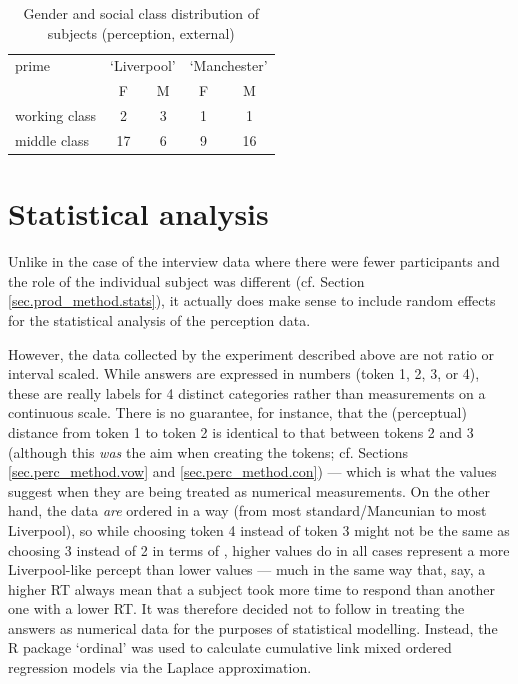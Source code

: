 \begin{table}[h]
	\caption[Gender and {social class} of subjects (perception)]{Gender and {social class} distribution of subjects (perception, external)}
	\label{tab.participants.perception}
	\centering
	\begin{tabular}{lcccc}
		\hline
		prime\is{priming} & \multicolumn{2}{c}{`Liverpool'} & \multicolumn{2}{c}{`Manchester'}\\
		& F & M & F & M\\
		\hline
		working class & 2 & 3 & 1 & 1\\
		middle class & 17 & 6 & 9 & 16\\
		\hline
	\end{tabular}
\end{table}

\section{Statistical analysis}\label{sec.perc_method.stats}

Unlike in the case of the interview data where there were fewer participants and the role of the individual subject was different (cf. Section \ref{sec.prod_method.stats}), it actually does make sense to include random effects for the statistical analysis of the perception data.

However, the data collected by the experiment described above are not ratio or interval scaled.
While answers are expressed in numbers (token 1, 2, 3, or 4), these are really labels for 4 distinct categories rather than measurements on a continuous scale.
There is no guarantee, for instance, that the (perceptual) distance from token 1 to token 2 is identical to that between tokens 2 and 3 (although this \emph{was} the aim when creating the tokens; cf. Sections \ref{sec.perc_method.vow} and \ref{sec.perc_method.con}) --- which is what the values suggest when they are being treated as numerical measurements.
On the other hand, the data \emph{are} ordered in a way (from most standard/Mancunian to most Liverpool), so while choosing token 4 instead of token 3 might not be the same as choosing 3 instead of 2 in terms of , higher values do in all cases represent a more Liverpool-like percept than lower values --- much in the same way that, say, a higher RT always mean that a subject took more time to respond than another one with a lower RT.
It was therefore decided not to follow \citealt{hayetal2006a,haydrager2010} in treating the answers as numerical data for the purposes of statistical modelling.
Instead, the R package `ordinal' \parencite{Rordinal} was used to calculate cumulative link mixed ordered regression models via the Laplace approximation.

